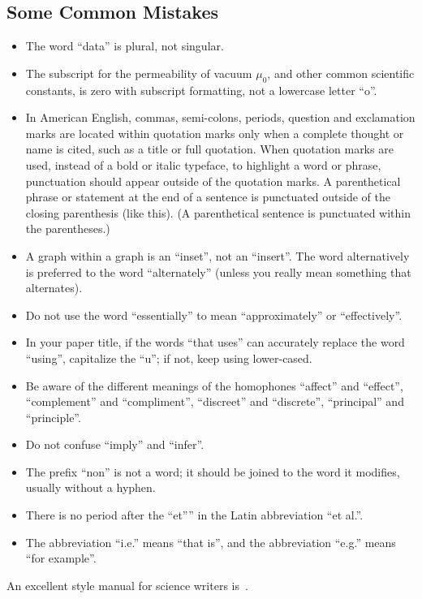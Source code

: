 \documentclass [a4paper,final,conference,10pt]{IDAACS}
\begin{document}
\subsection{Some Common Mistakes}

\begin{itemize}
\item {The word ``data'' is plural, not singular.}
\item {The subscript for the permeability of vacuum $\mu_0$, and other 
common scientific constants, is zero with subscript formatting, not a 
lowercase letter ``o''.}
\item {In American English, commas, semi-colons, periods, question and
exclamation marks are located within quotation marks only when a complete
thought or name is cited, such as a title or full quotation. When quotation
marks are used, instead of a bold or italic typeface, to highlight a word 
or phrase, punctuation should appear outside of the quotation marks. 
A parenthetical phrase or statement at the end of a sentence is punctuated 
outside of the closing parenthesis (like this). (A parenthetical sentence 
is punctuated within the parentheses.)}
\item{A graph within a graph is an ``inset'', not an ``insert''. The word 
alternatively is preferred to the word ``alternately'' (unless you really 
mean something that alternates).}
\item{Do not use the word ``essentially'' to mean ``approximately'' or 
``effectively''.}
\item{In your paper title, if the words ``that uses'' can accurately replace 
the word ``using'', capitalize the ``u''; if not, keep using lower-cased.}
\item{Be aware of the different meanings of the homophones ``affect'' and 
``effect'', ``complement'' and ``compliment'', ``discreet'' and ``discrete'',
``principal'' and ``principle''.}
\item{Do not confuse ``imply'' and ``infer''.}
\item{The prefix ``non'' is not a word; it should be joined to the word it 
modifies, usually without a hyphen.}
\item{There is no period after the ``et''” in the Latin abbreviation 
``et al.''.}
\item{The abbreviation ``i.e.'' means ``that is'', and the abbreviation 
``e.g.'' means ``for example''.}
\end{itemize}

An excellent style manual for science writers is~\cite{publ7}.
\end{document}
